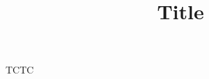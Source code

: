 \documentclass[12pt]{amsart}
\title{Title}
\begin{document}
  \maketitle
   
  \begin{problem}TCTC
    
  \end{problem}
  
\end{document}
